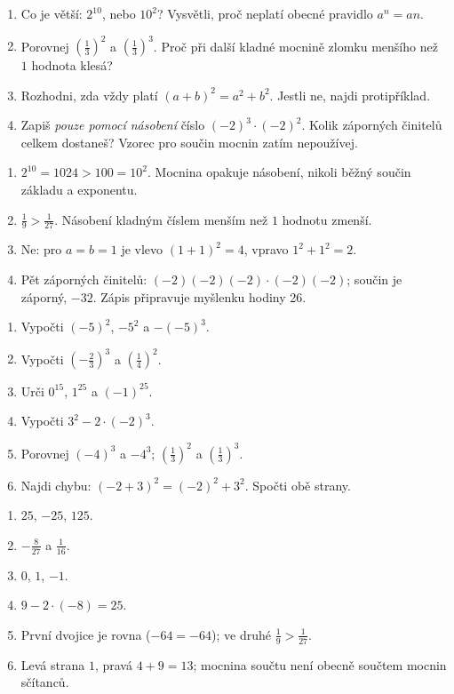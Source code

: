 \documentclass[11pt,a4paper]{article}
\begin{document}
\begin{zadaniReseniBox}[title={Rozšíření 1},breakable=false]
\begin{enumerate}[label=\alph*)]
 \item Co je větší: $2^{10}$, nebo $10^2$? Vysvětli, proč neplatí obecné pravidlo
 $a^n=an$.
 \item Porovnej $\left(\frac13\right)^2$ a $\left(\frac13\right)^3$.
 Proč při další kladné mocnině zlomku menšího než $1$ hodnota klesá?
 \item Rozhodni, zda vždy platí $(a+b)^2=a^2+b^2$.
 Jestli ne, najdi protipříklad.
 \item Zapiš \emph{pouze pomocí násobení} číslo $(-2)^3\cdot(-2)^2$.
 Kolik záporných činitelů celkem dostaneš? Vzorec pro součin mocnin zatím nepoužívej.
\end{enumerate}
\tcblower
\begin{enumerate}[label=\alph*)]
 \item $2^{10}=1024>100=10^2$. Mocnina opakuje násobení, nikoli běžný
     součin základu a exponentu.
 \item $\frac19>\frac1{27}$. Násobení kladným číslem menším než $1$ hodnotu zmenší.
 \item Ne: pro $a=b=1$ je vlevo $(1+1)^2=4$, vpravo $1^2+1^2=2$.
 \item Pět záporných činitelů:
     $(-2)(-2)(-2)\cdot(-2)(-2)$; součin je záporný, $-32$.
     Zápis připravuje myšlenku hodiny 26.
\end{enumerate}
\end{zadaniReseniBox}

\begin{zadaniReseniBox}[title={Domácí úkol},breakable=false]
\begin{enumerate}[label=\alph*)]
 \item Vypočti $(-5)^2$, $-5^2$ a $-(-5)^3$.
 \item Vypočti $\left(-\frac23\right)^3$ a $\left(\frac14\right)^2$.
 \item Urči $0^{15}$, $1^{25}$ a $(-1)^{25}$.
 \item Vypočti $3^2-2\cdot(-2)^3$.
 \item Porovnej $(-4)^3$ a $-4^3$; $\left(\frac13\right)^2$
    a $\left(\frac13\right)^3$.
 \item Najdi chybu: $(-2+3)^2=(-2)^2+3^2$. Spočti obě strany.
\end{enumerate}
\tcblower
\begin{enumerate}[label=\alph*)]
 \item $25$, $-25$, $125$.
 \item $-\frac8{27}$ a $\frac1{16}$.
 \item $0$, $1$, $-1$.
 \item $9-2\cdot(-8)=25$.
 \item První dvojice je rovna ($-64=-64$); ve druhé $\frac19>\frac1{27}$.
 \item Levá strana $1$, pravá $4+9=13$; mocnina součtu není
     obecně součtem mocnin sčítanců.
\end{enumerate}
\end{zadaniReseniBox}
\end{document}

